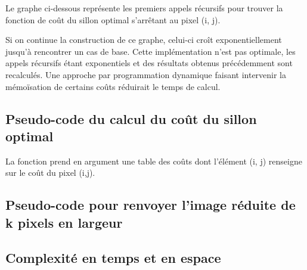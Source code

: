 \documentclass[a4paper, 11pt, oneside]{article}
\begin{document}
Le graphe ci-dessous représente les premiers appels récursifs pour trouver la fonction de coût du sillon optimal s'arrêtant au pixel (i, j). 

\begin{center}
\end{center}

Si on continue la construction de ce graphe, celui-ci croît exponentiellement jusqu'à rencontrer un cas de base. Cette implémentation n'est pas optimale, les appels récursifs étant exponentiels et des résultats obtenus précédemment sont recalculés. Une approche par programmation dynamique faisant intervenir la mémoïsation de certains coûts réduirait le temps de calcul.

\subsection{Pseudo-code du calcul du coût du sillon optimal}

La fonction  prend en argument une table des coûts dont l'élément (i, j) renseigne sur le coût du pixel (i,j).

\begin{codebox} %
\end{codebox}

\subsection{Pseudo-code pour renvoyer l'image réduite de k pixels en largeur}

\subsection{Complexité en temps et en espace}
\end{document}
